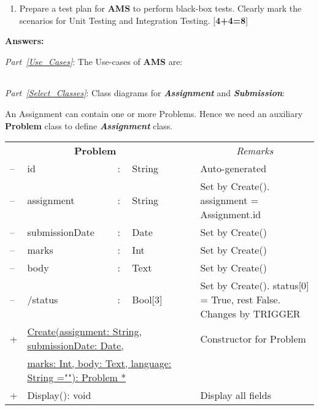 \documentclass{article}
\begin{document}
\begin{enumerate}
\begin{enumerate}
\item \label{Test-Plan} Prepare a test plan for {\bf AMS} to perform black-box tests. Clearly mark the scenarios for Unit Testing and Integration Testing. \hfill [{\bf 4+4=8}]

\end{enumerate}

{\bf Answers:}

{\em Part~\ref{Use_Cases}}: The Use-cases of {\bf AMS} are:
\begin{center}
\begin{tabular}{|l|} \hline
\\ \hline
\end{tabular}
\end{center}

{\em Part~\ref{Select_Classes}}: Class diagrams for {\bf \em Assignment} and {\bf \em Submission}:

An Assignment can contain one or more Problems. Hence we need an auxiliary {\bf Problem} class to define {\bf \em  Assignment} class.

\begin{center}
\begin{scriptsize}
\begin{tabular}{|lllll|l|p{7cm}|} \cline{1-5} \cline{7-7}
\multicolumn{5}{|c|}{\bf \textsf{Problem}} 			& & \multicolumn{1}{|c|}{\em Remarks}\\ \cline{1-5} \cline{7-7}
-- & \textsf{id} 			& : & String 	& & & Auto-generated\\
-- & \textsf{assignment}	& : & String 	& & & Set by Create(). \textsf{assignment} = \textsf{Assignment.id} \\
-- & \textsf{submissionDate}& : & Date 		& & & Set by Create() \\
-- & \textsf{marks}	 		& : & Int		& & & Set by Create() \\ 
-- & \textsf{body} 			& : & Text 		& & & Set by Create() \\ 
-- & /\textsf{status} 		& : & Bool[3] 	& & & Set by Create(). \textsf{status[0]} = True, rest False. Changes by TRIGGER\\ \cline{1-5} \cline{7-7}
 + & \multicolumn{4}{l|}{\underline{Create(assignment: String, submissionDate: Date, }} & & Constructor for \textsf{Problem} \\ 
   & \multicolumn{4}{l|}{\quad \quad \underline{marks: Int, body: Text, language: String =""): Problem *}} & &  \\
 + & \multicolumn{4}{l|}{Display(): void}  & & Display all fields \\ 
 \cline{1-5} \cline{7-7}
\end{tabular}
\end{scriptsize}
\end{center}


\end{enumerate}
\end{document}
